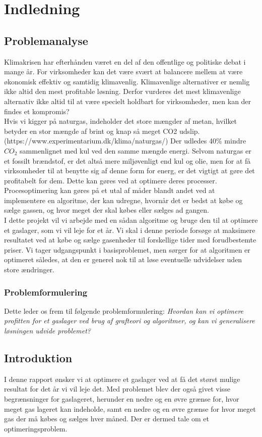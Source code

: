 \chapter{Indledning}
\section{Problemanalyse}
Klimakrisen har efterhånden været en del af den offentlige og politiske debat i mange år. For virksomheder kan det være svært at balancere mellem at være økonomisk effektiv og samtidig klimavenlig. Klimavenlige alternativer er nemlig ikke altid den mest profitable løsning. Derfor vurderes det mest klimavenlige alternativ ikke altid til at være specielt holdbart for virksomheder, men kan der findes et kompromis? 
\\

Hvis vi kigger på naturgas, indeholder det store mængder af metan, hvilket betyder en stor mængde af brint og knap så meget CO2 udslip. (https://www.experimentarium.dk/klima/naturgas/) Der udledes 40$\%$ mindre $CO_{2}$ sammenlignet med kul ved den samme mængde energi. Selvom naturgas er et fossilt brændstof, er det altså mere miljøvenligt end kul og olie, men for at få virksomheder til at benytte sig af denne form for energ, er det vigtigt at gøre det profitabelt for dem. Dette kan gøres ved at optimere deres processer.
Procesoptimering kan gøres på et utal af måder blandt andet ved at implementere en algoritme, der kan udregne, hvornår det er bedst at købe og sælge gassen, og hvor meget der skal købes eller sælges ad gangen. 
\\

I dette projekt vil vi arbejde med en sådan algoritme og bruge den til at optimere et gaslager, som vi vil leje for et år. Vi skal i denne periode forsøge at maksimere resultatet ved at købe og sælge gasenheder til forskellige tider med forudbestemte priser. Vi tager udgangspunkt i basisproblemet, men sørger for at algoritmen er optimeret således, at den er generel nok til at løse eventuelle udvidelser uden store ændringer.

\subsection{Problemformulering}
Dette leder os frem til følgende problemformulering:
\textit{Hvordan kan vi optimere profitten for et gaslager ved brug af grafteori og algoritmer, og kan vi generalisere løsningen udvide problemet?}

\section{Introduktion}
I denne rapport ønsker vi at optimere et gaslager ved at få det størst mulige resultat for det år vi vil leje det. Med problemet blev der også givet visse begrænsninger for gaslageret, herunder en nedre og en øvre grænse for, hvor meget gas lageret kan indeholde, samt en nedre og en øvre grænse for hvor meget gas der må købes og sælges hver måned. Der er dermed tale om et optimeringsproblem. 

